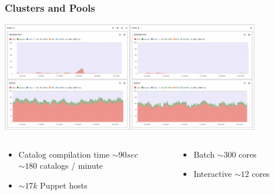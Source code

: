 \documentclass[aspectratio=169]{beamer}
\begin{document}
\begin{frame}

    \frametitle{Clusters and Pools}
    \begin{minipage}[t]{0.95\textwidth}
        \begin{center}
            \includegraphics[width=0.85\textwidth]{Puppet_Pools.png}
        \end{center}
    \end{minipage}
    \begin{minipage}[T]{0.95\textwidth}
        \begin{columns}
            \begin{column}{0.5\textwidth}
                \begin{itemize}
                    \item Catalog compilation time $\sim 90sec$ \\ $\sim 180$
                       catalogs / minute
                    \item $\sim 17k$ Puppet hosts
                \end{itemize}
            \end{column}
            \begin{column}{0.5\textwidth}
                \begin{itemize}
                    \item Batch $\sim 300$ cores
                    \item Interactive $\sim 12$ cores
                \end{itemize}
            \end{column}
        \end{columns}
    \end{minipage}

\end{frame}

\end{document}
